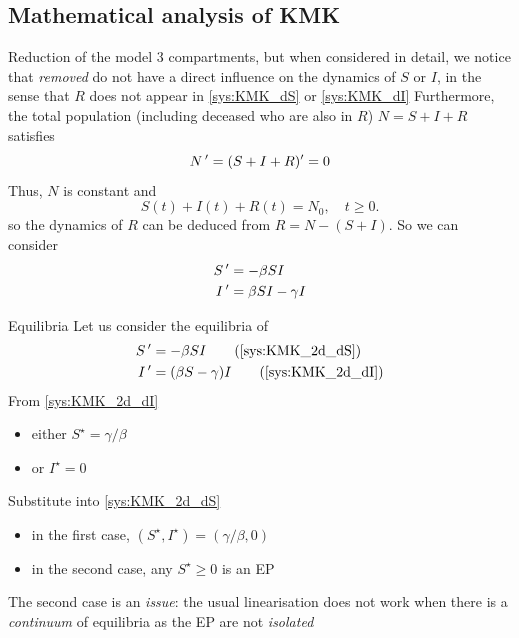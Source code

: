 \documentclass[aspectratio=169]{beamer}\usepackage[]{graphicx}\usepackage[]{xcolor}
\begin{document}
\subsection{Mathematical analysis of KMK}


\begin{frame}{Reduction of the model}
  3 compartments, but when considered in detail, we notice that \emph{removed} do not have a direct influence on the dynamics of $S$ or $I$, in the sense that $R$ does not appear in \eqref{sys:KMK_dS} or \eqref{sys:KMK_dI}
  \vfill
  Furthermore, the total population (including deceased who are also in $R$) $N=S+I+R$ satisfies
  \[
  N\,'=(S+I+R)'=0
  \]
  Thus, $N$ is constant and 
  \begin{equation}\label{eq:constant_population}
    S(t)+I(t)+R(t)=N_0,\quad t\geq 0.
  \end{equation}
  so the dynamics of $R$ can be deduced from $R=N-(S+I)$.
  So we can consider
  \begin{subequations}\label{sys:KMK_2d}
    \begin{align}
      S\,' &= -\beta SI \label{sys:KMK_2d_dS}\\
      I\,' &= \beta SI-\gamma I  \label{sys:KMK_2d_dI}
      \end{align}
    \end{subequations}
\end{frame}

\begin{frame}{Equilibria}
  Let us consider the equilibria of
  \begin{subequations}
    \begin{align}
      S\pprime &= -\beta SI 
      \tag{\ref{sys:KMK_2d_dS}} \\
      I\pprime &= (\beta S-\gamma)I  
      \tag{\ref{sys:KMK_2d_dI}}
    \end{align}
  \end{subequations}
\vfill
  From \eqref{sys:KMK_2d_dI}
  \begin{itemize}
    \item either $S^\star=\gamma/\beta$ 
    \item or $I^\star=0$
  \end{itemize}
  \vfill
  Substitute into \eqref{sys:KMK_2d_dS}
  \begin{itemize}
    \item in the first case, $(S^\star,I^\star)=(\gamma/\beta,0)$ 
    \item in the second case, any $S^\star\geq 0$ is an EP
  \end{itemize}
  \vfill
  The second case is an \emph{issue}: the usual linearisation does not work when there is a \emph{continuum} of equilibria as the EP are not \emph{isolated}
\end{frame}
\end{document}
